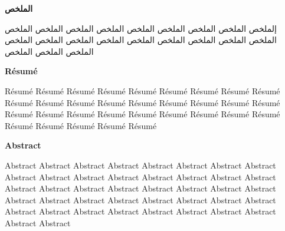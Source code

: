 \documentclass[sommairechap,stylejchiquet]{these_gi}
\begin{document}
\clearpage\thispagestyle{empty}
\begin{minipage}[c][24cm][c]{\textwidth}
\AddToShipoutPicture*{\BackgroundPicAbs}
\begin{arabtex}
\begin{center}

\textbf{  الملخص    } 
\end{center}

إلملخص     الملخص     الملخص     الملخص     الملخص     الملخص     الملخص     الملخص     الملخص     الملخص     الملخص     الملخص     الملخص     الملخص     الملخص     الملخص     الملخص     الملخص     الملخص     الملخص     الملخص    

\end{arabtex}

\begin{center}
\textbf{Résumé} 
\end{center}

Résumé  Résumé  Résumé  Résumé  Résumé  Résumé  Résumé  Résumé  Résumé  Résumé  Résumé  Résumé  Résumé  Résumé  Résumé  Résumé  Résumé  Résumé  Résumé  Résumé  Résumé  Résumé  Résumé  Résumé  Résumé  Résumé  Résumé  Résumé  Résumé  Résumé  Résumé  Résumé  

\begin{otherlanguage}{english}

\begin{center}
\textbf{Abstract}
\end{center}

Abstract Abstract Abstract Abstract Abstract Abstract Abstract Abstract Abstract Abstract Abstract Abstract Abstract Abstract Abstract Abstract Abstract Abstract Abstract Abstract Abstract Abstract Abstract Abstract Abstract Abstract Abstract Abstract Abstract Abstract Abstract Abstract Abstract Abstract Abstract Abstract Abstract Abstract Abstract Abstract Abstract Abstract 
\end{otherlanguage}
 \end{minipage}
\end{document}
